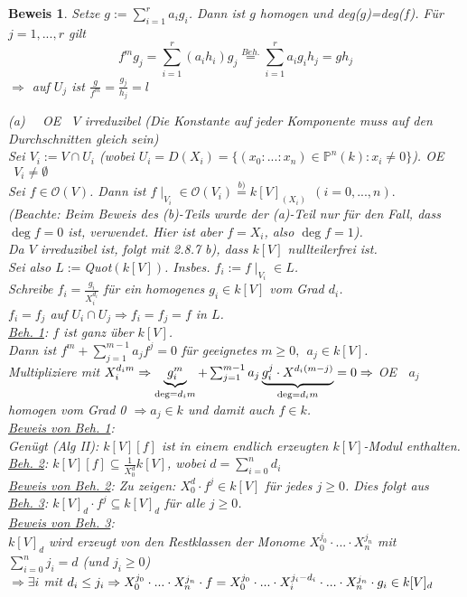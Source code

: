 \documentclass[a4paper,12pt]{report}
\theoremstyle{break}
\theoremstyle{nonumberbreak}
\theoremstyle{nonumberplain}
\newtheorem{Bew}{Beweis}
\renewcommand{\OE}{O\!\!E~}
\begin{document}
\begin{Bew}
Setze $g:= \sum_{i=1}^ra_ig_i$. Dann ist $g$ homogen und deg($g$)=deg($f$). Für $j=1,...,r$ gilt
$$f^mg_j=\sum_{i=1}^r(a_ih_i)g_j\stackrel{Beh.}{=}\sum_{i=1}^ra_ig_ih_j=gh_j$$
$\Rightarrow$ auf $U_j$ ist $\frac{g}{f^m}=\frac{g_j}{h_j}=l$

(a)~~ \OE $~~V$ irreduzibel (Die Konstante auf jeder Komponente muss auf den Durchschnitten gleich sein)\\
Sei $V_i:= V\cap U_i$ (wobei $U_i=D(X_i)=\{(x_0:...:x_n)\in\mathbb{P}^n(k): x_i\neq 0\}$). \OE $~~V_i\neq\emptyset$\\
Sei $f\in\mathcal{O}(V)$. Dann ist $f\mid_{V_i}\in\mathcal{O}(V_i)\stackrel{b)}{=}k[V]_{(X_i)} ~~(i=0,...,n).$\\
(Beachte: Beim Beweis des (b)-Teils wurde der (a)-Teil nur für den Fall, dass $\deg f=0$ ist, verwendet. Hier ist aber $f=X_i$, also $\deg f=1$).\\
Da $V$ irreduzibel ist, folgt mit 2.8.7 b), dass $k[V]$ nullteilerfrei ist.\\
Sei also $L:=$Quot$(k[V])$. Insbes. $f_i:=f\mid_{V_i}\in L$.\\
Schreibe $f_i=\frac{g_i}{X_i^{d_i}}$ für ein homogenes $g_i\in k[V]$ vom Grad $d_i$.\\
$f_i=f_j$ auf $U_i\cap U_j \Rightarrow f_i=f_j=f$ in $L$.\\
\underline{Beh. 1}: $f$ ist ganz über $k[V]$.\\
Dann ist $f^m+\sum_{j=1}^{m-1}a_jf^j=0$ für geeignetes $m\geq 0,~~ a_j\in k[V]$.\\
Multipliziere mit $X_i^{d_im}\Rightarrow \underbrace{g_i^m}_{\deg = d_im}+ \sum_{j=1}^{m-1}a_j\underbrace{g_i^j\cdot X^{d_i(m-j)}}_{\deg = d_im}=0\\
\Rightarrow$ \OE $~~a_j$ homogen vom Grad 0 $\Rightarrow a_j\in k$ und damit auch $f\in k$.\\
\underline{Beweis von Beh. 1}:\\
Genügt (Alg II): $k[V][f]$ ist in einem endlich erzeugten $k[V]$-Modul enthalten.\\
\underline{Beh. 2}: $k[V][f]\subseteq \frac{1}{X_0^d}k[V]$, wobei $d=\sum_{i=0}^nd_i$\\
\underline{Beweis von Beh. 2}: Zu zeigen: $X_0^d\cdot f^j\in k[V]$ für jedes $j\geq 0$. Dies folgt aus \\
\underline{Beh. 3}: $k[V]_d\cdot f^j\subseteq k[V]_d$ für alle $j\geq 0$.\\
\underline{Beweis von Beh. 3}:\\
$k[V]_d$ wird erzeugt von den Restklassen der Monome $X_0^{j_0}\cdot ... \cdot X_n^{j_n}$ mit $\sum_{i=0}^nj_i=d$ (und $j_i\geq 0$)\\
$\Rightarrow\exists i$ mit $d_i\leq j_i\\
\Rightarrow X_0^{j_0}\cdot ... \cdot X_n^{j_n}\cdot f=X_0^{j_0}\cdot ... \cdot X_i^{j_i-d_i}\cdot ... \cdot X_n^{j_n}\cdot g_i\in k[V]_d$
\end{Bew}
\end{document}
